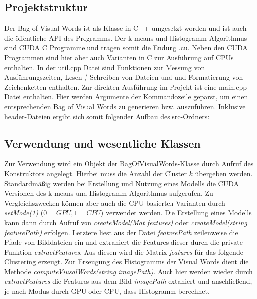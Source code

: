 \subsection{Projektstruktur}

Der Bag of Visual Words ist als Klasse in C++ umgesetzt worden und ist auch die öffentliche API des Programms. Der k-means und Histogramm Algorithmus sind CUDA C Programme und tragen somit die Endung .cu. Neben den CUDA Programmen sind hier aber auch Varianten in C zur Ausführung auf CPUs enthalten. In der util.cpp Datei sind Funktionen zur Messung von Ausführungszeiten, Lesen / Schreiben von Dateien und und Formatierung von Zeichenketten enthalten. Zur direkten Ausführung im Projekt ist eine main.cpp Datei enthalten. Hier werden Argumente der Kommandozeile geparst, um einen entsprechenden Bag of Visual Words zu generieren bzw. auszuführen. Inklusive header-Dateien ergibt sich somit folgender Aufbau des src-Ordners:

\subsection{Verwendung und wesentliche Klassen}

Zur Verwendung wird ein Objekt der BagOfVisualWords-Klasse durch Aufruf des Konstruktors angelegt. Hierbei muss die Anzahl der Cluster $k$ übergeben werden. Standardmäßig werden bei Erstellung und Nutzung eines Modells die CUDA Versionen des k-means und Histogramm Algorithmus aufgerufen. Zu Vergleichszwecken können aber auch die CPU-basierten Varianten durch \textit{setMode(1)} ($0 = GPU, 1 = CPU$) verwendet werden. Die Erstellung eines Modells kann dann durch Aufruf von \textit{createModel(Mat features)} oder \textit{createModel(string featurePath)} erfolgen. Letztere liest aus der Datei \textit{featurePath} zeilenweise die Pfade von Bilddateien ein und extrahiert die Features dieser durch die private Funktion \textit{extractFeatures}. Aus diesen wird die Matrix \textit{features} für das folgende Clustering erzeugt.
Zur Erzeugung des Histogramms der Visual Words dient die Methode \textit{computeViusalWords(string imagePath)}. Auch hier werden wieder durch \textit{extractFeatures} die Features aus dem Bild \textit{imagePath} extahiert und anschließend, je nach Modus durch GPU oder CPU, dass Histogramm berechnet. 

